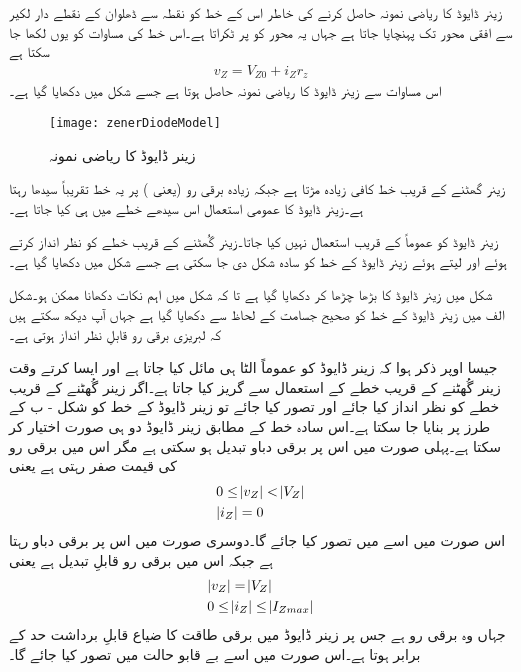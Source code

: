 زینر ڈایوڈ کا ریاضی نمونہ حاصل کرنے کی خاطر اس کے خط کو نقطہ   سے ڈھلوان   کے نقطے دار لکیر سے افقی محور تک پہنچایا جاتا ہے جہاں یہ محور کو   پر ٹکراتا ہے۔اس خط کی مساوات کو یوں لکھا جا سکتا ہے
\begin{align}
v_Z=V_{Z0}+i_Z r_z
\end{align}
اس مساوات سے زینر ڈایوڈ کا ریاضی نمونہ حاصل ہوتا ہے جسے شکل  میں دکھایا گیا ہے۔
\begin{figure}
\centering
\texttt{[image: zenerDiodeModel]}
\caption{زینر ڈایوڈ کا ریاضی نمونہ}
\label{شکل_زینر_ڈایوڈ_کا_ماڈل}
\end{figure}
زینر گھٹنے کے قریب خط کافی زیادہ مڑتا ہے جبکہ زیادہ برقی رو (یعنی   ) پر یہ خط تقریباً سیدھا رہتا ہے۔زینر ڈایوڈ کا عمومی استعمال اس سیدھے خطے میں ہی کیا جاتا ہے۔


زینر ڈایوڈ کو عموماً  کے قریب استعمال نہیں کیا جاتا۔زینر گُھٹنے کے قریب خطے کو نظر انداز کرتے ہوئے اور   لیتے ہوئے زینر ڈایوڈ کے خط کو سادہ شکل دی جا سکتی ہے جسے شکل میں دکھایا گیا ہے۔

شکل   میں زینر ڈایوڈ کا  بڑھا چڑھا کر دکھایا گیا ہے تا کہ شکل میں اہم نکات دکھانا ممکن ہو۔شکل  الف میں زینر ڈایوڈ کے خط کو صحیح جسامت کے لحاظ سے دکھایا گیا ہے جہاں آپ دیکھ سکتے ہیں کہ لبریزی برقی رو قابلِ نظر انداز ہوتی ہے۔

جیسا اوپر ذکر ہوا کہ زینر ڈایوڈ کو عموماً الٹا ہی مائل کیا جاتا ہے اور ایسا کرتے وقت زینر گُھٹنے کے قریب خطے کے استعمال سے گریز کیا جاتا ہے۔اگر زینر گُھٹنے کے قریب خطے کو نظر انداز کیا جائے اور    تصور کیا جائے تو زینر ڈایوڈ کے خط کو  شکل  - ب کے طرز پر بنایا جا سکتا ہے۔اس سادہ خط کے مطابق زینر ڈایوڈ دو ہی صورت اختیار کر سکتا ہے۔پہلی صورت میں اس پر برقی دباو تبدیل ہو سکتی ہے مگر اس میں برقی رو کی قیمت صفر رہتی ہے یعنی
\begin{gather} \label{مساوات_زینر_سادہ_مساوات_الف}
\begin{aligned}
& 0  \leq \abs{v_Z} < \abs{V_Z}\\
& \abs{i_Z}=0
\end{aligned}
\end{gather}
اس صورت میں اسے  میں تصور کیا جائے گا۔دوسری صورت میں اس پر برقی دباو   رہتا ہے جبکہ اس میں برقی رو قابلِ تبدیل ہے یعنی
\begin{gather} \label{مساوات_زینر_سادہ_مساوات_ب}
\begin{aligned}
& \abs{v_Z}= \abs{V_Z}\\
& 0 \leq  \abs{i_Z} \leq \abs{I_{Zmax}}
\end{aligned}
\end{gather}
جہاں   وہ برقی رو ہے جس پر زینر ڈایوڈ میں برقی طاقت کا ضیاع قابلِ برداشت حد کے برابر ہوتا ہے۔اس صورت میں اسے بے قابو حالت میں تصور کیا جائے گا۔

